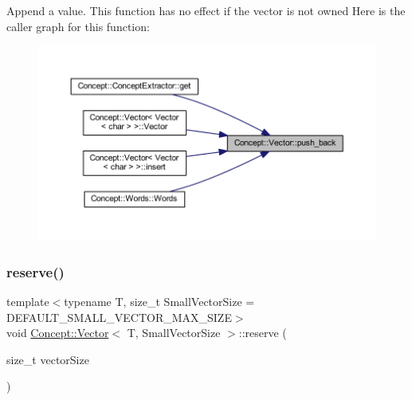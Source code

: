 Append a value. This function has no effect if the vector is not owned Here is the caller graph for this function\+:\nopagebreak
\begin{figure}[H]
\begin{center}
\leavevmode
\includegraphics[width=350pt]{class_concept_1_1_vector_a561e80a9c94307340601b7ab2270e101_icgraph}
\end{center}
\end{figure}
\mbox{\label{class_concept_1_1_vector_a5d08a1e6b61f98f85076646d06ba8640}} 
\subsubsection{\texorpdfstring{reserve()}{reserve()}}
{\footnotesize\ttfamily template$<$typename T, size\+\_\+t Small\+Vector\+Size = D\+E\+F\+A\+U\+L\+T\+\_\+\+S\+M\+A\+L\+L\+\_\+\+V\+E\+C\+T\+O\+R\+\_\+\+M\+A\+X\+\_\+\+S\+I\+ZE$>$ \\
void \mbox{\hyperlink{class_concept_1_1_vector}{Concept\+::\+Vector}}$<$ T, Small\+Vector\+Size $>$\+::reserve (\begin{DoxyParamCaption}\item[{size\+\_\+t}]{vector\+Size }\end{DoxyParamCaption})\hspace{0.3cm}{\ttfamily [inline]}}

